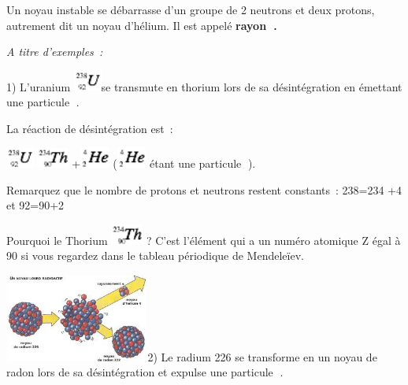 Un noyau instable se débarrasse d'un groupe de 2 neutrons et deux
protons, autrement dit un noyau d'hélium. Il est appelé \textbf{rayon
.}

\emph{A titre d'exemples~:}

1) L'uranium
\includegraphics[width=0.918cm,height=0.683cm]{Pictures/100000010000001A000000137145F016F0439DB0.png}se
transmute en thorium lors de sa désintégration en émettant une particule
.

La réaction de désintégration est~:

\includegraphics[width=0.918cm,height=0.683cm]{Pictures/100000010000001A000000137145F016F0439DB0.png}\includegraphics[width=1.059cm,height=0.683cm]{Pictures/100000010000001E000000138E6A8FDDE5499982.png}
+\includegraphics[width=0.966cm,height=0.683cm]{Pictures/100000010000001B00000013CE6DE589828DD379.png}\textbf{
}(\includegraphics[width=0.966cm,height=0.683cm]{Pictures/100000010000001B00000013CE6DE589828DD379.png}
étant une particule ).

Remarquez que le nombre de protons et neutrons restent constants~:
238=234 +4 et 92=90+2

Pourquoi le Thorium
\includegraphics[width=1.059cm,height=0.683cm]{Pictures/100000010000001E000000138E6A8FDDE5499982.png}
? C'est l'élément qui a un numéro atomique Z égal à 90 si vous regardez
dans le tableau périodique de Mendeleïev.

\includegraphics[width=4.75cm,height=2.903cm]{Pictures/100000000000011D000000B18BB391CD0E0D8FA2.jpg}2)
Le radium 226 se transforme en un noyau de radon lors de sa
désintégration et expulse une particule .

